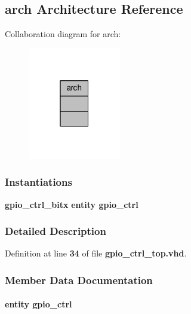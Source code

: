 \subsection{arch Architecture Reference}
\label{classgpio__ctrl__top_1_1arch}


Collaboration diagram for arch\+:\nopagebreak
\begin{figure}[H]
\begin{center}
\leavevmode
\includegraphics[width=115pt]{da/d9d/classgpio__ctrl__top_1_1arch__coll__graph}
\end{center}
\end{figure}
\subsubsection*{Instantiations}
 \begin{DoxyCompactItemize}
\item 
{\bf gpio\+\_\+ctrl\+\_\+bitx}  {\bfseries entity gpio\+\_\+ctrl}   
\end{DoxyCompactItemize}


\subsubsection{Detailed Description}


Definition at line {\bf 34} of file {\bf gpio\+\_\+ctrl\+\_\+top.\+vhd}.



\subsubsection{Member Data Documentation}
\paragraph[{gpio\+\_\+ctrl\+\_\+bitx}]{ {\bfseries \textcolor{keywordflow}{entity}\textcolor{vhdlchar}{ }\textcolor{vhdlchar}{gpio\+\_\+ctrl}\textcolor{vhdlchar}{ }} \hspace{0.3cm}{\ttfamily [Instantiation]}}\label{classgpio__ctrl__top_1_1arch_acbfeb6ccd7e6fa269d9371632de25676}


